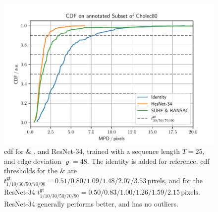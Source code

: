 \begin{figure}[tb]
\centering
\includegraphics[width=\textwidth]{fig/frac/cdf.pdf}
\caption{\gls{cdf} for  \& , and ResNet-34, trained with a sequence length $T=25$, and edge deviation $\varrho=48$. The identity is added for reference. \gls{cdf} thresholds for the  \&  are $t^\text{gt}_{1/10/30/50/70/90} = 0.51/0.80/1.09/1.48/2.07/3.53\,\text{pixels}$, and for the ResNet-34 $t^\text{gt}_{1/10/30/50/70/90} = 0.50/0.83/1.00/1.26/1.59/2.15\,\text{pixels}$. ResNet-34 generally performs better, and has no outliers.}
\label{c3:fig:resnet34_c}
\end{figure}



